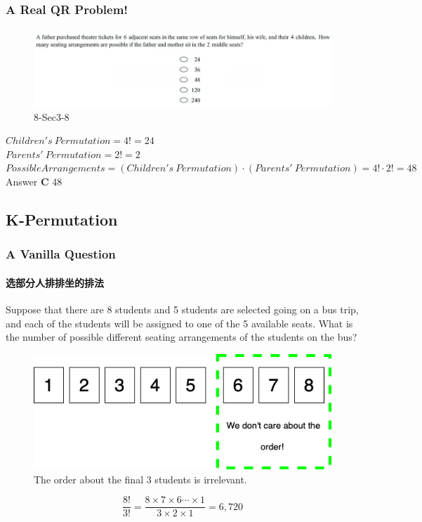 \documentclass[
	11pt, %
	handout,
]{beamer}
\begin{document}
\begin{frame}
	\frametitle{A Real QR Problem!}
	\framesubtitle{}
	\begin{figure}
		\includegraphics[width=\linewidth]{K-Permutation_Example_Question.png}
		\caption{8-Sec3-8}
	\end{figure}
	\pause
$Children's\ Permutation= 4! =24$\\
$Parents'\ Permutation= 2! =2$\\
$Possible Arrangements= (Children's\ Permutation) \cdot (Parents'\ Permutation) =4! \cdot 2!=48$\\

\pause
\bigskip
Answer \textbf{C}  48
\end{frame}



\subsection{K-Permutation}

 
 \begin{frame}
	\frametitle{A Vanilla Question} %
	\framesubtitle{选部分人排排坐的排法}
	 Suppose that there are 8 students and 5 students are selected going on a bus trip, and each
of the students will be assigned to one of the 5 available seats. What is  the
number of possible different seating arrangements of the students on the
bus?

	\begin{figure}
		\includegraphics[width=0.5\linewidth]{K_permutation.png}
		\caption{The order about the final 3 students is irrelevant.}
	\end{figure}
	\begin{equation}
		\frac{8!}{3!} = \frac{8\times7\times6\cdots\times1}{3\times2\times1} = 6,720
	\end{equation}
\end{frame}
\end{document}
